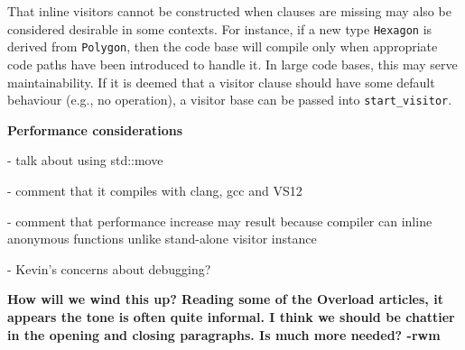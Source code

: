 \documentclass[10pt,a4paper,twocolumn]{article}
\renewcommand\section[1]{
    \begin{minipage}[c]{0.94\linewidth}
    \large \raggedright \sffamily \textbf{#1}
    \end{minipage}
}
\newcommand\mycode[1]{{\small\texttt{#1}}}
\begin{document}
That inline visitors cannot be constructed when clauses are missing may also be
considered desirable in some contexts. For instance, if a new type
\mycode{Hexagon} is derived from \mycode{Polygon}, then the code base will
compile only when appropriate code paths have been introduced to handle it. In
large code bases, this may serve maintainability. If it is deemed that a visitor
clause should have some default behaviour (e.g., no operation), a visitor base
can be passed into \mycode{start\_visitor}.

\section{Performance considerations}

- talk about using std::move

- comment that it compiles with clang, gcc and VS12

- comment that performance increase may result because compiler can inline
anonymous functions unlike stand-alone visitor instance
 
- Kevin's concerns about debugging?

\textbf{How will we wind this up? Reading some of the Overload articles, it
appears the tone is often quite informal. I think we should be chattier in the
opening and closing paragraphs. Is much more needed? -rwm}
\end{document}
